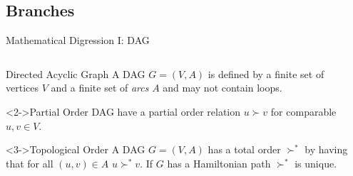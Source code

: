 \documentclass[xetex]{beamer}
\begin{document}
\subsection{Branches}

\begin{frame}[fragile]{Mathematical Digression I: DAG}
  \begin{columns}
    \begin{column}{.55\linewidth}
      \begin{block}{Directed Acyclic Graph}
        A DAG $G = (V,A)$ is defined by a finite set of vertices $V$ and a
        finite set of \emph{arcs} $A$ and may not contain loops.
      \end{block}

      \begin{block}<2->{Partial Order}
        DAG have a partial order relation $u \succ v$ for comparable $u,v \in V$.
      \end{block}

      \begin{alertblock}<3->{Topological Order}
        A DAG $G = (V,A)$ has a total order $\succ^*$ by having that for all
        $(u, v) \in A$ $u \succ^* v$. If $G$ has a Hamiltonian path
        $\succ^*$
        is unique.
      \end{alertblock}
    \end{column}
    \begin{column}{.45\linewidth}
\end{column}
\end{columns}
\end{frame}
\end{document}
